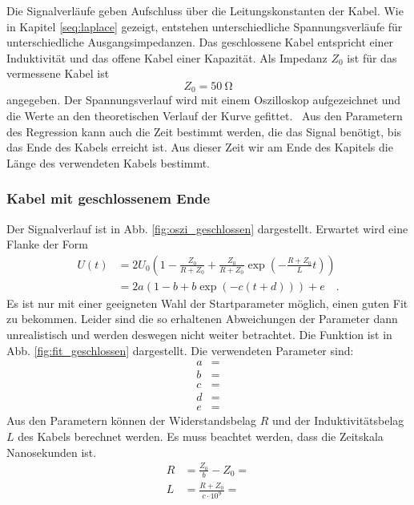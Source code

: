 Die Signalverläufe geben Aufschluss über die Leitungskonstanten der Kabel. Wie in Kapitel \ref{seq:laplace} gezeigt, entstehen unterschiedliche Spannungsverläufe für unterschiedliche Ausgangsimpedanzen. Das geschlossene Kabel entspricht einer Induktivität und das offene Kabel einer Kapazität. Als Impedanz $Z_0$ ist für das vermessene Kabel ist
\begin{equation}
	Z_0 = \SI{50}{\ohm}
\end{equation}
angegeben. Der Spannungsverlauf wird mit einem Oszilloskop aufgezeichnet und die Werte an den theoretischen Verlauf der Kurve gefittet. \
Aus den Parametern des Regression kann auch die Zeit bestimmt werden, die das Signal benötigt, bis das Ende des Kabels erreicht ist. Aus dieser Zeit wir am Ende des Kapitels die Länge des verwendeten Kabels bestimmt.

\subsubsection{Kabel mit geschlossenem Ende}\label{sec:kapazitat}
Der Signalverlauf ist in Abb. \ref{fig:oszi_geschlossen} dargestellt. Erwartet wird eine Flanke der Form
\begin{align}
			U(t) &= 2U_0\left(1 - \frac{Z_0}{R+Z_0} + \frac{Z_0}{R+Z_0}\exp\left(-\frac{R+Z_0}{L}t\right)\right) \\
			&= 2 a \left(1- b + b \exp(-c (t+d))   \right) + e \quad .
\end{align}
Es ist nur mit einer geeigneten Wahl der Startparameter möglich, einen guten Fit zu bekommen. Leider sind die so erhaltenen Abweichungen der Parameter dann unrealistisch und werden deswegen nicht weiter betrachtet. Die Funktion ist in Abb. \ref{fig:fit_geschlossen} dargestellt. Die verwendeten Parameter sind:
\begin{align}
	a &=  \\
	b &=  \\
	c &=  \\
	d &=  \\
	e &=  
\end{align}
Aus den Parametern können der Widerstandsbelag $R$ und der Induktivitätsbelag $L$ des Kabels berechnet werden. Es muss beachtet werden, dass die Zeitskala Nanosekunden ist.
\begin{align}
	R &= \frac{Z_0}{b} - Z_0 =  \\
	L &= \frac{R + Z_0}{ c \cdot 10^9} = 
\end{align}




